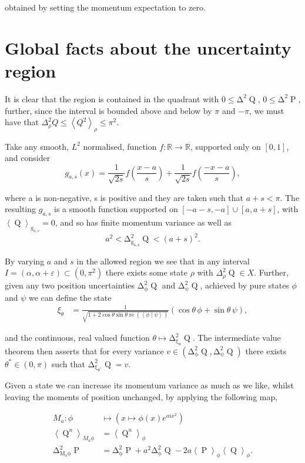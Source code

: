 \documentclass[prb,amsmath,amssymb,notitlepage]{revtex4-1}
\newcommand{\varr}[1]{\Delta^2_\rho #1} %
\newcommand{\var}[2]{\operatorname{\Delta^{\!2}_{{#2}}} #1}
\newcommand{\expr}[1]{\left\langle #1\right\rangle_\rho} %
\newcommand{\expe}[2]{\left\langle #1\right\rangle_{#2}}
\newcommand{\braket}[2]{\left\langle #1 \middle| #2 \right\rangle}
\DeclareMathOperator{\opp}{P}
\DeclareMathOperator{\opq}{Q}
\DeclareMathOperator{\re}{re}
\begin{document}
obtained by setting the momentum expectation to zero.

\section{Global facts about the uncertainty region}
It is clear that the region is contained in the quadrant with $0 \leq\var{\opq}{}$, $0\leq\var{\opp}{}$, further, since the interval is bounded above and below by $\pi$ and $-\pi$, we must have that $\varr{Q} \leq \expr{Q^2} \leq \pi^2$. 

Take any smooth, $L^2$ normalised, function $f: \mathbb{R} \to \mathbb{R}$, supported only on $[0,1]$, and consider
\begin{equation}
	g_{a,s}(x) = \frac{1}{\sqrt{2s}}f\left(\frac{x-a}{s}\right) +\frac{1}{\sqrt{2s}}f\left(\frac{-x-a}{s}\right),
\end{equation}

where a is non-negative, s is positive and they are taken such that $a+s < \pi$. The resulting $g_{a,s}$ is a smooth function supported on $[-a-s, -a] \cup [a,a+s]$, with $\expe{\opq}{g_{a,s}} = 0$, and so has finite momentum variance as well as
\begin{equation}
	a^2 < \var{\opq}{g_{a,s}} < (a+s)^2.
\end{equation}

By varying $a$ and $s$ in the allowed region we see that in any interval $I = (\alpha, \alpha+\varepsilon) \subset (0,\pi^2)$ there exists some state $\rho$ with $\varr{\opq} \in X$. Further, given any two position uncertainties $\var{\opq}{\phi}$ and $\var{\opq}{\psi}$, achieved by pure states $\phi$ and $\psi$ we can define the state
\begin{align}
	\xi_\theta &= \frac{1}{\sqrt{1+2\cos\theta\sin\theta\re\left(\braket{\phi}{\psi}\right)}}\left(\cos\theta\,\phi + \sin\theta\,\psi \right),
\end{align}
 
and the continuous, real valued function $\theta\mapsto\var{\opq}{\xi_\theta}$. The intermediate value theorem then asserts that for every variance $v\in(\var{\opq}{\phi},\var{\opq}{\psi})$ there exists $\theta^*\in(0,\pi)$ such that $\var{\opq}{\xi_{\theta^*}} = v$.

Given a state we can increase its momentum variance as much as we like, whilst leaving the moments of position unchanged, by applying the following map,

\begin{align}
	M_a : \phi &\mapsto \left(x \mapsto \phi(x) e^{a i x^2}\right)\\
	\expe{\opq^n}{M_a\phi} &= \expe{\opq^n}{\phi}\\
	\var{\opp}{M_a\phi} &= \var{\opp}{\phi} + a^2 \var{\opq}{\phi} - 2a\expe{\opp}{\phi}\expe{\opq}{\phi}.
\end{align}
\end{document}
